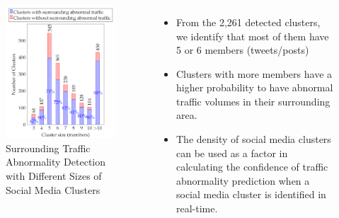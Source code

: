 \begin{frame}
    \frametitle{}
    \begin{columns}
            \begin{figure}
            \centering
            \includegraphics[width=\columnwidth]{resource/figures/caseStudy2_barChart.png}
            \vspace{-0.2cm}
        	\caption{\tiny Surrounding Traffic Abnormality Detection with Different Sizes of Social Media Clusters}
            \end{figure}
            \begin{itemize} \small
                \item From the 2,261 detected clusters, we identify that most of them have 5 or 6 members (tweets/posts)
                \item Clusters with more members have a higher probability to have abnormal traffic volumes in their surrounding area. 
                \item The density of social media clusters can be used as a factor in calculating the confidence of traffic abnormality prediction when a social media cluster is identified in real-time.
            \end{itemize}
    \end{columns}
\end{frame}


